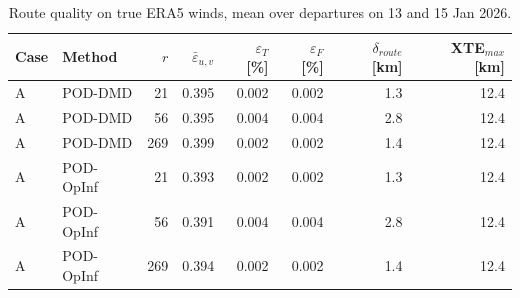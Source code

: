\begin{table}[t]
\centering
\small
\caption{Route quality on true ERA5 winds, mean over departures on 13 and 15 Jan 2026.}
\label{tab:route}
\begin{tabular}{llrrrrrr}
\toprule
Case & Method & $r$ & $\bar\varepsilon_{u,v}$ & $\varepsilon_T$ [\%] & $\varepsilon_F$ [\%] & $\delta_{route}$ [km] & XTE$_{max}$ [km] \\
\midrule
A & POD-DMD & 21 & 0.395 & 0.002 & 0.002 & 1.3 & 12.4 \\
A & POD-DMD & 56 & 0.395 & 0.004 & 0.004 & 2.8 & 12.4 \\
A & POD-DMD & 269 & 0.399 & 0.002 & 0.002 & 1.4 & 12.4 \\
A & POD-OpInf & 21 & 0.393 & 0.002 & 0.002 & 1.3 & 12.4 \\
A & POD-OpInf & 56 & 0.391 & 0.004 & 0.004 & 2.8 & 12.4 \\
A & POD-OpInf & 269 & 0.394 & 0.002 & 0.002 & 1.4 & 12.4 \\
\bottomrule
\end{tabular}
\end{table}